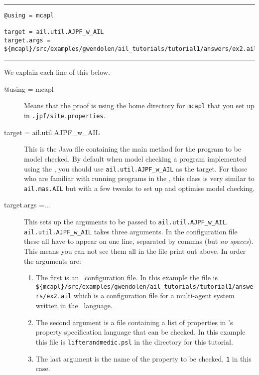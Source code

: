 \documentclass[a4]{article}
\begin{document}
\newpage
\noindent\rule{\textwidth}{1pt}
\begin{small}
\begin{verbatim}
@using = mcapl

target = ail.util.AJPF_w_AIL
target.args = ${mcapl}/src/examples/gwendolen/ail_tutorials/tutorial1/answers/ex2.ail,${mcapl}/src/examples/gwendolen/ajpf_tutorials/tutorial1/lifterandmedic.psl,1

\end{verbatim}
\end{small}
\rule{\textwidth}{1pt}

We explain each line of this below.

\begin{sloppypar}
\begin{description}
\item[@using = mcapl] Means that the proof is using the home directory for \texttt{mcapl} that you set up in \texttt{.jpf/site.properties}.
\item[target = ail.util.AJPF\_w\_AIL] This is the Java file containing the main method for the program to be model checked.  By default when model checking a program implemented using the \ail, you should use \texttt{ail.util.AJPF\_w\_AIL} as the target.  For those who are familiar with running programs in the \ail, this class is very similar to \texttt{ail.mas.AIL} but with a few tweaks to set up and optimise model checking.
\item[target.args =...] This sets up the arguments to be passed to \texttt{ail.util.AJPF\_w\_AIL}.  \texttt{ail.util.AJPF\_w\_AIL} takes three arguments.  In the configuration file these all have to appear on one line, separated by commas (but \emph{no spaces}).  This means you can not see them all in the file print out above.  In order the arguments are:
\begin{enumerate}
\item The first is an \ail\ configuration file.  In this example the file is \texttt{\$\{mcapl\}/src/examples/gwendolen/ail\_tutorials/tutorial1/answers/ex2.ail} which is a configuration file for a multi-agent system written in the \gwendolen\ language.
\item The second argument is a file containing a list of properties in \ajpf's property specification language that can be checked.  In this example this file is \texttt{lifterandmedic.psl} in the directory for this tutorial.
\item The last argument is the name of the property to be checked, \texttt{1} in this case.
\end{enumerate}
\end{description}
\end{sloppypar}
\end{document}
